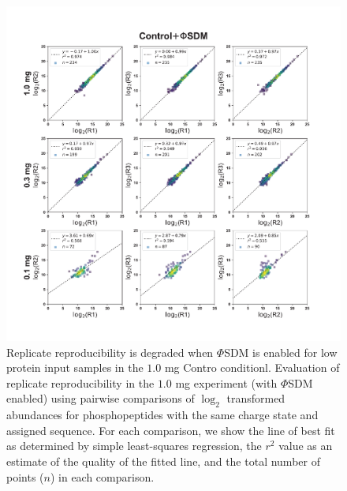 \documentclass[journal=jprobs,manuscript=article]{achemso}
\begin{document}
\clearpage

\begin{figure}[t!]
\centering
\includegraphics[width=175mm]{figures/supplements/controlsdm_replicate_reprod.pdf}
\caption{Replicate reproducibility is degraded when $\Phi$SDM is enabled for low protein input samples in the $1.0$ mg Contro conditionl. Evaluation of replicate reproducibility in the $1.0$ mg experiment (with $\Phi$SDM enabled) using pairwise comparisons of $\log_2$ transformed abundances for phosphopeptides with the same charge state and assigned sequence. For each comparison, we show the line of best fit as determined by simple least-squares regression, the $r^2$ value as an estimate of the quality of the fitted line, and the total number of points ($n$) in each comparison. }\label{controlsdm_replicate_reprod}
\end{figure}

\clearpage
\end{document}

